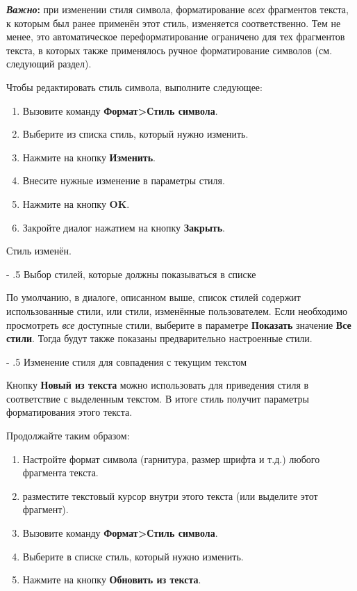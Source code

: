 \documentclass[a4paper,10pt]{article}
\makeatletter
\renewcommand\paragraph{%
   \@startsection{paragraph}{4}{0mm}%
      {-\baselineskip}%
      {.5\baselineskip}%
      {\normalfont\normalsize\bfseries}}
\makeatother
\begin{document}
\begin{mdframed}[backgroundcolor=blue!10]
\textbf{\textit{Важно}:} при изменении стиля символа, форматирование \textit{всех} фрагментов текста, к которым был ранее применён этот стиль, изменяется соответственно. Тем не менее, это автоматическое переформатирование ограничено для тех фрагментов текста, в которых также применялось ручное форматирование символов (см. следующий раздел).
\end{mdframed}
Чтобы редактировать стиль символа, выполните следующее:
\begin{enumerate}
 \item Вызовите команду \textbf{Формат>Стиль символа}.
 \item Выберите из списка стиль, который нужно изменить.
 \item Нажмите на кнопку \textbf{Изменить}.
 \item Внесите нужные изменение в параметры стиля.
 \item Нажмите на кнопку \textbf{OK}.
 \item Закройте диалог нажатием на кнопку \textbf{Закрыть}.
\end{enumerate}

Стиль изменён.

\paragraph{Выбор стилей, которые должны показываться в списке}

По умолчанию, в диалоге, описанном выше, список стилей содержит использованные стили, или стили, изменённые пользователем. Если необходимо просмотреть \textit{все} доступные стили, выберите в параметре \textbf{Показать} значение \textbf{Все стили}. Тогда будут также показаны предварительно настроенные стили.

\paragraph{Изменение стиля для совпадения с текущим текстом}

Кнопку \textbf{Новый из текста} можно использовать для приведения стиля в соответствие с выделенным текстом. В итоге стиль получит параметры форматирования этого текста.

Продолжайте таким образом:
\begin{enumerate}
 \item Настройте формат символа (гарнитура, размер шрифта и т.д.) любого фрагмента текста.
 \item разместите текстовый курсор внутри этого текста (или выделите этот фрагмент).
 \item Вызовите команду \textbf{Формат>Стиль символа}.
 \item Выберите в списке стиль, который нужно  изменить.
 \item Нажмите на кнопку \textbf{Обновить из текста}.
\end{enumerate}
\end{document}
